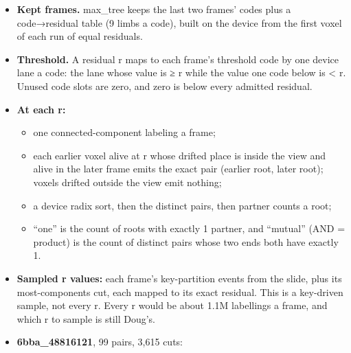 \begin{itemize}
\item \textbf{Kept frames.} max\_\allowbreak{}tree keeps the last two frames' codes plus a code→residual table (9 limbs a code), built on the device from the first voxel of each run of equal residuals.
\item \textbf{Threshold.} A residual r maps to each frame's threshold code by one device lane a code: the lane whose value is ≥ r while the value one code below is < r. Unused code slots are zero, and zero is below every admitted residual.
\item \textbf{At each r:}

\begin{itemize}
\item one connected-component labeling a frame;
\item each earlier voxel alive at r whose drifted place is inside the view and alive in the later frame emits the exact pair (earlier root, later root); voxels drifted outside the view emit nothing;
\item a device radix sort, then the distinct pairs, then partner counts a root;
\item “one” is the count of roots with exactly 1 partner, and “mutual” (AND = product) is the count of distinct pairs whose two ends both have exactly 1.
\end{itemize}
\item \textbf{Sampled r values:} each frame's key-partition events from the slide, plus its most-components cut, each mapped to its exact residual. This is a key-driven sample, not every r. Every r would be about 1.1M labellings a frame, and which r to sample is still Doug's.
\item \textbf{6bba\_\allowbreak{}48816121}, 99 pairs, 3,615 cuts:


\end{itemize}
